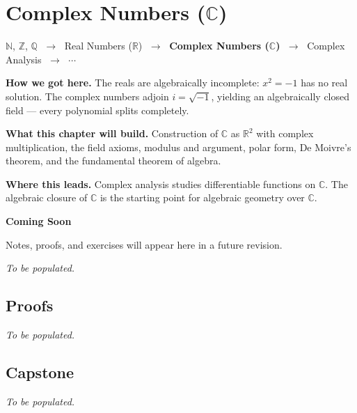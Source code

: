 \chapter{Complex Numbers ($\mathbb{C}$)}

\begin{tcolorbox}[
  colback=gray!6,
  colframe=gray!40,
  arc=2pt,
  left=8pt, right=8pt, top=6pt, bottom=6pt,
  title={\small\textbf{Where You Are in the Journey}},
  fonttitle=\small\bfseries
]
\begin{center}
\small
$\mathbb{N}$, $\mathbb{Z}$, $\mathbb{Q}$
$\;\to\;$ Real Numbers ($\mathbb{R}$)
$\;\to\;$ \textbf{Complex Numbers ($\mathbb{C}$)}
$\;\to\;$ Complex Analysis
$\;\to\;$ $\cdots$
\end{center}

\medskip
\noindent\textbf{How we got here.}
The reals are algebraically incomplete: $x^2 = -1$ has no real solution.
The complex numbers adjoin $i = \sqrt{-1}$, yielding an algebraically
closed field --- every polynomial splits completely.

\medskip
\noindent\textbf{What this chapter will build.}
Construction of $\mathbb{C}$ as $\mathbb{R}^2$ with complex multiplication,
the field axioms, modulus and argument, polar form, De Moivre's theorem,
and the fundamental theorem of algebra.

\medskip
\noindent\textbf{Where this leads.}
Complex analysis studies differentiable functions on $\mathbb{C}$.
The algebraic closure of $\mathbb{C}$ is the starting point for
algebraic geometry over $\mathbb{C}$.
\end{tcolorbox}

\vspace{1em}
\begin{tcolorbox}[
  colback=gray!6, colframe=gray!40, arc=2pt,
  left=8pt, right=8pt, top=6pt, bottom=6pt,
  title={\small\textbf{Status: Planned}},
  fonttitle=\small\bfseries
]
\begin{center}\Large\bfseries Coming Soon\end{center}
\vspace{6pt}
\noindent Notes, proofs, and exercises will appear here in a future revision.
\end{tcolorbox}

\textit{To be populated.}

\section*{Proofs}
\textit{To be populated.}

\section*{Capstone}
\textit{To be populated.}
